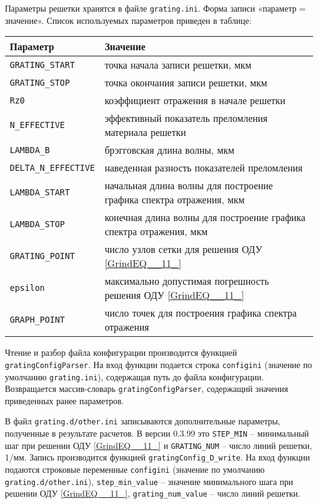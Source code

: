Параметры решетки хранятся в файле \texttt{grating.ini}. Форма записи «параметр = значение». Список используемых параметров приведен в таблице:

\vspace{1em}
\renewcommand{\arraystretch}{1.4}
\begin{tabular}{|l|p{300pt}|}
\hline
Параметр & Значение \\
\hline
\hline
\texttt{GRATING\_START} & точка начала записи решетки, мкм \\
\hline
\texttt{GRATING\_STOP} & точка окончания записи решетки, мкм \\
\hline
\texttt{Rz0} & коэффициент отражения в начале решетки \\
\hline
\texttt{N\_EFFECTIVE} & эффективный показатель преломления материала решетки \\
\hline
\texttt{LAMBDA\_B} & брэгговская длина волны, мкм \\
\hline
\texttt{DELTA\_N\_EFFECTIVE} & наведенная разность показателей преломления \\
\hline
\texttt{LAMBDA\_START} & начальная длина волны для построение графика спектра отражения, мкм \\
\hline
\texttt{LAMBDA\_STOP} & конечная длина волны для построение графика спектра отражения, мкм \\
\hline
\texttt{GRATING\_POINT} & число узлов сетки для решения ОДУ \eqref{GrindEQ__11_} \\
\hline
\texttt{epsilon} & максимально допустимая погрешность решения ОДУ \eqref{GrindEQ__11_} \\
\hline
\texttt{GRAPH\_POINT} & число точек для построения графика спектра отражения \\
\hline
\end{tabular}
\vspace{1em}

Чтение и разбор файла конфигурации производится функцией \texttt{gratingConfigParser}. На вход функции подается строка \texttt{configini} (значение по умолчанию \texttt{grating.ini}), содержащая путь до файла конфигурации. Возвращается массив-словарь \texttt{gratingConfigParser}, содержащий значения приведенных ранее параметров.

В файл \texttt{grating.d/other.ini} записываются дополнительные параметры, полученные в результате расчетов. В версии 0.3.99 это \texttt{STEP\_MIN} -- минимальный шаг при решении ОДУ \eqref{GrindEQ__11_} и \texttt{GRATING\_NUM} -- число линий решетки, 1/мм. Запись производится функцией \texttt{gratingConfig\_D\_write}. На вход функции подаются строковые переменные \texttt{configini} (значение по умолчанию \texttt{grating.d/other.ini}), \texttt{step\_min\_value} -- значение минимального шага при решении ОДУ \eqref{GrindEQ__11_}, \texttt{grating\_num\_value} -- число линий решетки.

